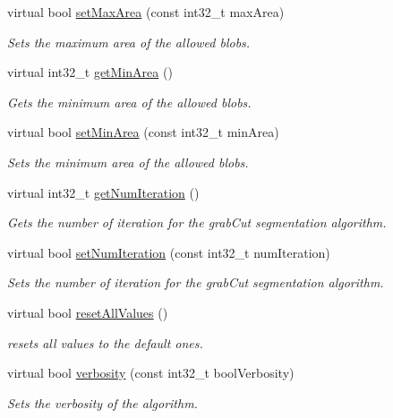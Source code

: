 \begin{DoxyCompactItemize}
virtual bool \hyperlink{classlbpExtract__IDLServer_a81dbd91a1460cdb450a7f7824e6d9953}{set\+Max\+Area} (const int32\+\_\+t max\+Area)
\begin{DoxyCompactList}\small\item\em Sets the maximum area of the allowed blobs. \end{DoxyCompactList}\item 
virtual int32\+\_\+t \hyperlink{classlbpExtract__IDLServer_a3f6f2aba33eeb0a15d73fdfc5817ef7a}{get\+Min\+Area} ()
\begin{DoxyCompactList}\small\item\em Gets the minimum area of the allowed blobs. \end{DoxyCompactList}\item 
virtual bool \hyperlink{classlbpExtract__IDLServer_a13eb918e54b2eee6fe2811fbe8f6aee6}{set\+Min\+Area} (const int32\+\_\+t min\+Area)
\begin{DoxyCompactList}\small\item\em Sets the minimum area of the allowed blobs. \end{DoxyCompactList}\item 
virtual int32\+\_\+t \hyperlink{classlbpExtract__IDLServer_a48094f72a89aa3218e3449dfe071f0f7}{get\+Num\+Iteration} ()
\begin{DoxyCompactList}\small\item\em Gets the number of iteration for the grab\+Cut segmentation algorithm. \end{DoxyCompactList}\item 
virtual bool \hyperlink{classlbpExtract__IDLServer_a2955fa69c12b59a03c2b1e130747b054}{set\+Num\+Iteration} (const int32\+\_\+t num\+Iteration)
\begin{DoxyCompactList}\small\item\em Sets the number of iteration for the grab\+Cut segmentation algorithm. \end{DoxyCompactList}\item 
virtual bool \hyperlink{classlbpExtract__IDLServer_a88f2492af4a66eaf9be8ceb28c862fe5}{reset\+All\+Values} ()
\begin{DoxyCompactList}\small\item\em resets all values to the default ones. \end{DoxyCompactList}\item 
virtual bool \hyperlink{classlbpExtract__IDLServer_a1b9021d363199f1a334c7ec2c23801b1}{verbosity} (const int32\+\_\+t bool\+Verbosity)
\begin{DoxyCompactList}\small\item\em Sets the verbosity of the algorithm. \end{DoxyCompactList}\item 

\end{DoxyCompactItemize}
